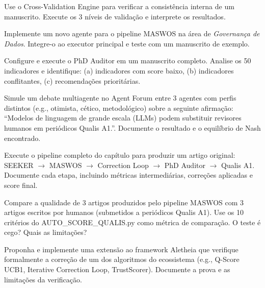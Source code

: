 \begin{exercicio}[Intermediario]
Use o Cross-Validation Engine para verificar a consistência interna
de um manuscrito. Execute os 3 níveis de validação e interprete os
resultados.
\end{exercicio}

\begin{exercicio}[Avancado]
Implemente um novo agente para o pipeline MASWOS na área de
\textit{Governança de Dados}. Integre-o ao executor principal e
teste com um manuscrito de exemplo.
\end{exercicio}

\begin{exercicio}[Avancado]
Configure e execute o PhD Auditor em um manuscrito completo.
Analise os 50 indicadores e identifique: (a) indicadores com score
baixo, (b) indicadores conflitantes, (c) recomendações prioritárias.
\end{exercicio}

\begin{exercicio}[Avancado]
Simule um debate multiagente no Agent Forum entre 3 agentes com
perfis distintos (e.g., otimista, cético, metodológico) sobre a
seguinte afirmação: ``Modelos de linguagem de grande escala (LLMs)
podem substituir revisores humanos em periódicos Qualis A1.''.
Documente o resultado e o equilíbrio de Nash encontrado.
\end{exercicio}

\begin{exercicio}[PhD]
Execute o pipeline completo do capítulo para produzir um artigo
original: SEEKER $\rightarrow$ MASWOS $\rightarrow$ Correction Loop
$\rightarrow$ PhD Auditor $\rightarrow$ Qualis A1. Documente cada
etapa, incluindo métricas intermediárias, correções aplicadas e
score final.
\end{exercicio}

\begin{exercicio}[PhD]
Compare a qualidade de 3 artigos produzidos pelo pipeline MASWOS com
3 artigos escritos por humanos (submetidos a periódicos Qualis A1).
Use os 10 critérios do AUTO\_SCORE\_QUALIS.py como métrica de
comparação. O teste é cego? Quais as limitações?
\end{exercicio}

\begin{exercicio}[PhD]
Proponha e implemente uma extensão ao framework Aletheia que
verifique formalmente a correção de um dos algoritmos do ecossistema
(e.g., Q-Score UCB1, Iterative Correction Loop, TrustScorer).
Documente a prova e as limitações da verificação.
\end{exercicio}

